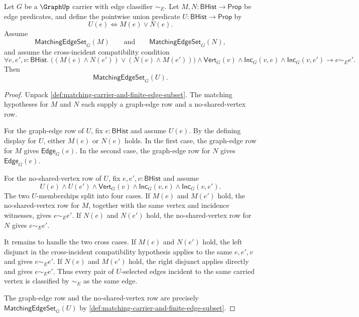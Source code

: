\begin{theorem}
\label{thm:matching-compatible-union-closure}
Let $G$ be a $\GraphUp$ carrier with edge classifier $\sim_E$. Let $M,N:\mathsf{BHist}\to\mathsf{Prop}$ be edge predicates, and define the pointwise union predicate $U:\mathsf{BHist}\to\mathsf{Prop}$ by
$$
U(e)\Longleftrightarrow M(e)\vee N(e).
$$
Assume
$$
\mathsf{MatchingEdgeSet}_G(M)
\qquad\text{and}\qquad
\mathsf{MatchingEdgeSet}_G(N),
$$
and assume the cross-incident compatibility condition
$$
\forall e,e',v:\mathsf{BHist}.\;
\bigl((M(e)\land N(e'))\vee(N(e)\land M(e'))\bigr)
\land \mathsf{Vert}_G(v)\land\mathsf{Inc}_G(v,e)\land\mathsf{Inc}_G(v,e')
\to e\sim_E e'.
$$
Then
$$
\mathsf{MatchingEdgeSet}_G(U).
$$
\end{theorem}
\begin{proof}
Unpack \autoref{def:matching-carrier-and-finite-edge-subset}. The matching hypotheses for $M$ and $N$ each supply a graph-edge row and a no-shared-vertex row.

For the graph-edge row of $U$, fix $e:\mathsf{BHist}$ and assume $U(e)$. By the defining display for $U$, either $M(e)$ or $N(e)$ holds. In the first case, the graph-edge row for $M$ gives $\mathsf{Edge}_G(e)$. In the second case, the graph-edge row for $N$ gives $\mathsf{Edge}_G(e)$.

For the no-shared-vertex row of $U$, fix $e,e',v:\mathsf{BHist}$ and assume
$$
U(e)\land U(e')\land\mathsf{Vert}_G(v)\land\mathsf{Inc}_G(v,e)\land\mathsf{Inc}_G(v,e').
$$
The two $U$-memberships split into four cases. If $M(e)$ and $M(e')$ hold, the no-shared-vertex row for $M$, together with the same vertex and incidence witnesses, gives $e\sim_E e'$. If $N(e)$ and $N(e')$ hold, the no-shared-vertex row for $N$ gives $e\sim_E e'$.

It remains to handle the two cross cases. If $M(e)$ and $N(e')$ hold, the left disjunct in the cross-incident compatibility hypothesis applies to the same $e,e',v$ and gives $e\sim_E e'$. If $N(e)$ and $M(e')$ hold, the right disjunct applies directly and gives $e\sim_E e'$. Thus every pair of $U$-selected edges incident to the same carried vertex is classified by $\sim_E$ as the same edge.

The graph-edge row and the no-shared-vertex row are precisely $\mathsf{MatchingEdgeSet}_G(U)$ by \autoref{def:matching-carrier-and-finite-edge-subset}.
\end{proof}

